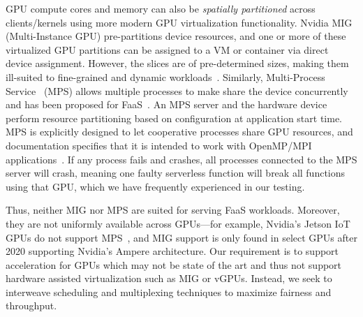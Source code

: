

GPU compute cores and memory can also be \emph{spatially partitioned} across clients/kernels using more modern GPU virtualization functionality. 
Nvidia MIG~\cite{nvidia-mig} (Multi-Instance GPU) pre-partitions device resources, and one or more of these virtualized GPU partitions can be assigned to a VM or container via direct device assignment.
However, the slices are of pre-determined sizes, making them ill-suited to fine-grained and dynamic workloads~\cite{li2022miso}. 
Similarly, Multi-Process Service~\cite{nvidia-mps} (MPS) allows multiple processes to make share the device concurrently and has been proposed for FaaS~\cite{gu2023fast}.
An MPS server and the hardware device perform resource partitioning based on configuration at application start time.
MPS is explicitly designed to let cooperative processes share GPU resources, and documentation specifies that it is intended to work with OpenMP/MPI applications~\cite{nvidia-mps}.
If any process fails and crashes, all processes connected to the MPS server will crash, meaning one faulty serverless function will break all functions using that GPU, which we have frequently experienced in our testing.

Thus, neither MIG nor MPS are suited for serving FaaS workloads.
Moreover, they are not uniformly available across GPUs---for example, Nvidia's Jetson IoT GPUs do not support MPS~\cite{jetson-no-mps}, and MIG support is only found in select GPUs after 2020 supporting Nvidia's Ampere architecture.
Our requirement is to support acceleration for GPUs which may not be state of the art and thus not support hardware assisted virtualization such as MIG or vGPUs.
Instead, we seek to interweave scheduling and multiplexing techniques to maximize fairness and throughput.






